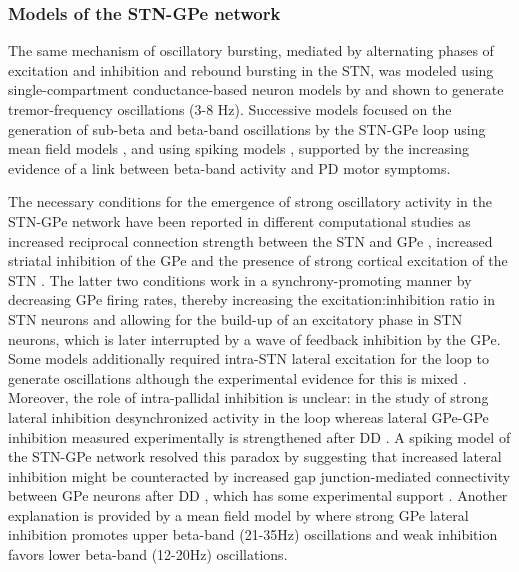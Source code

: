 %
\subsubsection{Models of the STN-GPe network}

The same mechanism of oscillatory
bursting, mediated by alternating phases of excitation and inhibition and rebound bursting
in the STN, was modeled using single-compartment conductance-based neuron models by
\cite{terman_activity_2002} and shown to generate tremor-frequency oscillations (3-8 Hz).
Successive models focused on the generation of sub-beta and beta-band oscillations by the STN-GPe loop using
mean field models \cite{gillies_subthalamic-pallidal_2002,holgado_conditions_2010,pavlides_improved_2012,pasillas-lepine_delay-induced_2013,davidson_analysis_2016}, and using spiking models \cite{park_neural_2011,kumar_role_2011,mandali_spiking_2015,merrison-hort_emergence_2013,ahn_synchronized_2016,wei_role_2015,schwab_sparse_2016},
supported by the increasing evidence of a link between beta-band activity and PD motor symptoms.

%
The necessary conditions for the emergence of strong oscillatory activity in the
STN-GPe network have been reported in different computational studies as increased
reciprocal connection strength between the STN and GPe \cite{terman_activity_2002,holgado_conditions_2010,pavlides_improved_2012,park_neural_2011,wei_role_2015},
increased striatal inhibition of the GPe \cite{terman_activity_2002,kumar_role_2011,holgado_conditions_2010,van_albada_mean-field_2009}
and the presence of strong cortical excitation of the STN \cite{kumar_role_2011,nevado-holgado_effective_2014}.
The latter two conditions work in a synchrony-promoting manner by decreasing GPe
firing rates, thereby increasing the excitation:inhibition ratio in STN neurons
and allowing for the build-up of an excitatory phase in STN neurons, which is later
interrupted by a wave of feedback inhibition by the GPe.
Some models additionally required intra-STN lateral excitation for the
loop to generate oscillations \cite{gillies_subthalamic-pallidal_2002,mandali_spiking_2015}
although the experimental evidence for this is mixed \cite{steiner_connectivity_2019}. %
Moreover, the role of intra-pallidal inhibition is unclear: in the study of \cite{terman_activity_2002}
strong lateral inhibition desynchronized activity in the loop whereas lateral GPe-GPe inhibition
measured experimentally is strengthened after DD \cite{miguelez_altered_2012,watanabe_presynaptic_2009}.
A spiking model of the STN-GPe network resolved this paradox by suggesting that increased lateral
inhibition might be counteracted by increased gap junction-mediated connectivity between GPe
neurons after DD \cite{schwab_sparse_2016}, which has some experimental support
\cite{rash_immunogold_2000,schwab_pallidal_2014,phookan_gap_2015}. Another explanation
is provided by a mean field model by \cite{liu_neural_2017} where strong GPe lateral
inhibition promotes upper beta-band (21-35Hz) oscillations and weak inhibition favors
lower beta-band (12-20Hz) oscillations.



